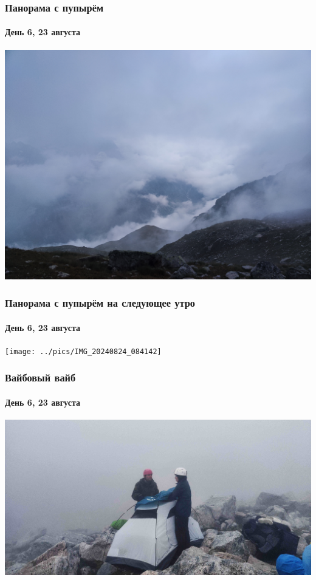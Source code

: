 \begin{frame}
	\frametitle{Панорама с пупырём}
	\framesubtitle{День 6, 23 августа}
	\centering
	\includegraphics[width=\textwidth]{../pics/IMG_20240823_190305}			
\end{frame} 

\begin{frame}
	\frametitle{Панорама с пупырём на следующее утро}
	\framesubtitle{День 6, 23 августа}
	\centering
	\texttt{[image: ../pics/IMG\_20240824\_084142]}			
\end{frame}

\begin{frame}
	\frametitle{Вайбовый вайб}
	\framesubtitle{День 6, 23 августа}
	\centering
	\includegraphics[width=\textwidth]{../pics/IMG_20240823_184041}			
\end{frame}


